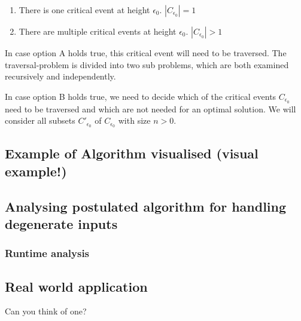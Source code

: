 \begin{enumerate}[label=(\Alph*)]
	\item There is one critical event at height $\epsilon_0$. $|C_{\epsilon_0}| = 1$
	\item There are multiple critical events at height $\epsilon_0$. $|C_{\epsilon_0}| > 1$
\end{enumerate}

In case option A holds true, this critical event will need to be traversed. The traversal-problem is divided into two sub problems, which are both examined recursively and independently.

In case option B holds true, we need to decide which of the critical events $C_{\epsilon_0}$ need to be traversed and which are not needed for an optimal solution. We will consider all subsets $C'_{\epsilon_0}$ of $C_{\epsilon_0}$ with size $n>0$.


\subsection{Example of Algorithm visualised (visual example!)}

\subsection{Analysing postulated algorithm for handling degenerate inputs}
\subsubsection{Runtime analysis}
\subsection{Real world application}
	Can you think of one?
	
	
	
	